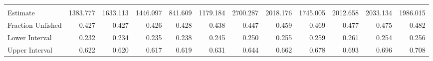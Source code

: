 \documentclass[11pt,
  english,
]{article}
\begin{document}
\begin{table}[H]
{\begin{tabular}[t]{lrrrrrrrrrrr}
\addlinespace[0.3em]
\multicolumn{12}{l}{\textbf{Fraction Unfished}}\\
\hspace{1em}Estimate & 1383.777 & 1633.113 & 1446.097 & 841.609 & 1179.184 & 2700.287 & 2018.176 & 1745.005 & 2012.658 & 2033.134 & 1986.015\\
\hspace{1em}Fraction Unfished & 0.427 & 0.427 & 0.426 & 0.428 & 0.438 & 0.447 & 0.459 & 0.469 & 0.477 & 0.475 & 0.482\\
\hspace{1em}Lower Interval & 0.232 & 0.234 & 0.235 & 0.238 & 0.245 & 0.250 & 0.255 & 0.259 & 0.261 & 0.254 & 0.256\\
Upper Interval & 0.622 & 0.620 & 0.617 & 0.619 & 0.631 & 0.644 & 0.662 & 0.678 & 0.693 & 0.696 & 0.708\\
\bottomrule
\end{tabular}}
\end{table}
\end{document}
